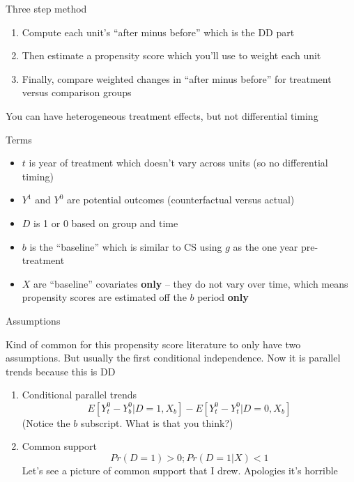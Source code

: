 \documentclass{beamer}
\begin{document}
\begin{frame}{Three step method}

\begin{enumerate}
\item Compute each unit's ``after minus before'' which is the DD part
\item Then estimate a propensity score which you'll use to weight each unit
\item Finally, compare weighted changes in ``after minus before'' for treatment versus comparison groups
\end{enumerate}

\bigskip

You can have heterogeneous treatment effects, but not differential timing

\end{frame}

\begin{frame}{Terms}

\begin{itemize}
\item $t$ is year of treatment which doesn't vary across units (so no differential timing)
\item $Y^1$ and $Y^0$ are potential outcomes (counterfactual versus actual)
\item $D$ is 1 or 0 based on group and time
\item $b$ is the ``baseline'' which is similar to CS using $g$ as the one year pre-treatment
\item $X$ are ``baseline'' covariates \textbf{only} -- they do not vary over time, which means propensity scores are estimated off the $b$ period \textbf{only}
\end{itemize}

\end{frame}

\begin{frame}{Assumptions}

Kind of common for this propensity score literature to only have two assumptions.  But usually the first conditional independence.  Now it is parallel trends because this is DD

\begin{enumerate}
\item Conditional parallel trends $$E[Y^0_t - Y^0_b|D=1,X_b] - E[Y^0_t - Y^0_t | D=0, X_b]$$ (Notice the $b$ subscript.  What is that you think?)
\item Common support $$Pr(D=1)>0; Pr(D=1|X)<1$$ Let's see a picture of common support that I drew.  Apologies it's horrible
\end{enumerate}

\end{frame}
\end{document}
